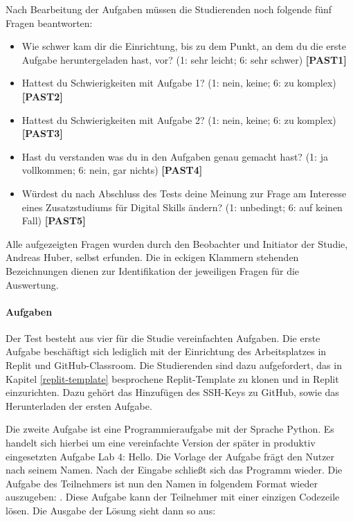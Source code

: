 Nach Bearbeitung der Aufgaben müssen die Studierenden noch folgende fünf
Fragen beantworten:

\begin{itemize}
    \item Wie schwer kam dir die Einrichtung, bis zu dem Punkt, an dem du die
    erste Aufgabe heruntergeladen hast, vor? (1: sehr leicht; 6: sehr schwer)
    \textbf{[PAST1]}
    \item Hattest du Schwierigkeiten mit Aufgabe 1? (1: nein, keine; 6: zu
    komplex) \textbf{[PAST2]}
    \item Hattest du Schwierigkeiten mit Aufgabe 2? (1: nein, keine; 6: zu
    komplex) \textbf{[PAST3]}
    \item Hast du verstanden was du in den Aufgaben genau gemacht hast? (1: ja
    vollkommen; 6: nein, gar nichts) \textbf{[PAST4]}
    \item Würdest du nach Abschluss des Tests deine Meinung zur Frage am
    Interesse eines Zusatzstudiums für Digital Skills ändern? (1: unbedingt;
    6: auf keinen Fall) \textbf{[PAST5]}
\end{itemize}

Alle aufgezeigten Fragen wurden durch den Beobachter und Initiator der Studie,
Andreas Huber, selbst erfunden. Die in eckigen Klammern stehenden
Bezeichnungen dienen zur Identifikation der jeweiligen Fragen für die
Auswertung. %

\paragraph{Aufgaben}
Der Test besteht aus vier für die Studie vereinfachten Aufgaben. Die erste
Aufgabe beschäftigt sich lediglich mit der Einrichtung des Arbeitsplatzes in
Replit und GitHub-Classroom. Die Studierenden sind dazu aufgefordert, das in 
Kapitel \ref{replit-template} besprochene Replit-Template zu klonen und in 
Replit einzurichten. Dazu gehört das Hinzufügen des SSH-Keys zu GitHub, sowie
das Herunterladen der ersten Aufgabe.

Die zweite Aufgabe ist eine Programmieraufgabe mit der Sprache Python. Es
handelt sich hierbei um eine vereinfachte Version der später in produktiv
eingesetzten Aufgabe \glqq Lab 4: Hello\grqq{}. Die Vorlage der Aufgabe
frägt den Nutzer nach seinem Namen. Nach der Eingabe schließt sich das Programm
wieder. Die Aufgabe des Teilnehmers ist nun den Namen in folgendem Format
wieder auszugeben: . Diese Aufgabe kann der
Teilnehmer mit einer einzigen Codezeile lösen. Die Ausgabe der Lösung sieht dann
so aus:

